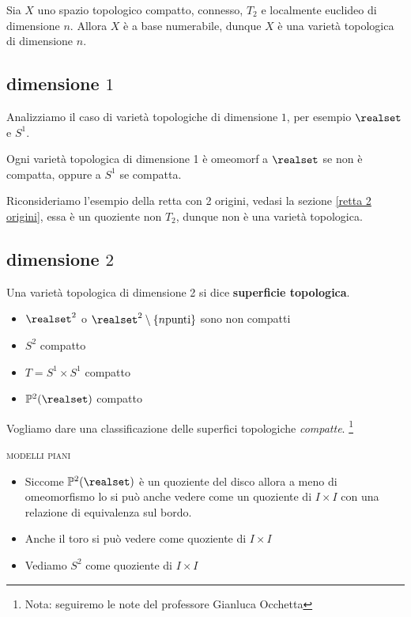 \begin{theorema}
	Sia $X$ uno spazio topologico compatto, connesso, $T_2$ e localmente euclideo di dimensione $n$. Allora $X$ è a base numerabile, dunque $X$ è una varietà topologica di dimensione $n$.
\end{theorema}
 
	\subsection{dimensione $1$}
Analizziamo il caso di varietà topologiche di dimensione $1$, per esempio $\realset$ e $S^1$.
\begin{theorema}
	Ogni varietà topologica di dimensione 1 è omeomorf a $\realset$ se non è compatta, oppure a $S^1$ se compatta.
\end{theorema} 
\begin{example} 
Riconsideriamo l'esempio della retta con 2 origini, vedasi la sezione \ref{retta 2 origini}, essa è un quoziente non $T_2$, dunque non è una varietà topologica.
\end{example}
	\subsection{dimensione $2$}
\begin{define} 
	Una varietà topologica di dimensione 2 si dice \textbf{superficie topologica}.
\end{define}
\begin{examples}
	\begin{itemize}
		\item $\realset^2$ o $\realset^2\setminus \{n \text{punti}\}$ sono non compatti
		\item $S^2$ compatto
		\item $T=S^1\times S^1$ compatto
		\item $\mathbb{P}^2(\realset)$ compatto
	\end{itemize}
\end{examples}
Vogliamo dare una classificazione delle superfici topologiche \textit{compatte}. \footnote{Nota: seguiremo le note del professore Gianluca Occhetta}
\begin{examples} \textsc{modelli piani}\\
	\begin{itemize}
		\item Siccome $\mathbb{P}^2(\realset)$ è un quoziente del disco allora a meno di omeomorfismo lo si può anche vedere come un quoziente di $I\times I$ con una relazione di equivalenza sul bordo.
		\item Anche il toro si può vedere come quoziente di $I\times I$
		\item Vediamo $S^2$ come quoziente di $I\times I$
	\end{itemize}
\end{examples}

